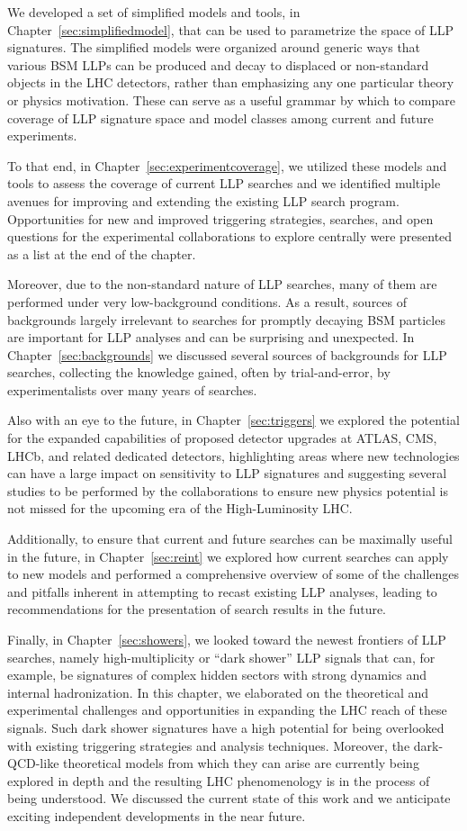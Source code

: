 We developed a set of simplified models and tools, in Chapter~\ref{sec:simplifiedmodel}, that can be used to parametrize the space of LLP signatures. The simplified models were organized around generic ways that various BSM LLPs can be produced and decay to displaced or non-standard objects in the LHC detectors, rather than emphasizing any one particular theory or physics motivation.
These can serve as a useful grammar by which to compare coverage of LLP signature space and model classes among current and future experiments.

To that end, in Chapter~\ref{sec:experimentcoverage}, we utilized these models and tools to assess the coverage of current LLP searches and we identified multiple avenues for improving and extending the existing LLP search program.
Opportunities for new and improved triggering strategies, searches, and open questions for the experimental collaborations to explore centrally were presented as a list at the end of the chapter.

Moreover, due to the non-standard nature of LLP searches, many of them are performed under very low-background conditions.
As a result, sources of backgrounds largely irrelevant to searches for promptly decaying BSM particles are important for LLP analyses and can be surprising and unexpected.
In Chapter~\ref{sec:backgrounds} we discussed several sources of backgrounds for LLP searches, collecting the knowledge gained, often by trial-and-error, by experimentalists over many years of searches.

Also with an eye to the future, in Chapter~\ref{sec:triggers} we explored the potential for the expanded capabilities of proposed detector upgrades at ATLAS, CMS, LHCb, and related dedicated detectors, highlighting areas where new technologies can have a large impact on sensitivity to LLP signatures and suggesting several studies to be performed by the collaborations to ensure new physics potential is not missed for the upcoming era of the High-Luminosity LHC.

Additionally, to ensure that current and future searches can be maximally useful in the future, in Chapter~\ref{sec:reint} we explored how current searches can apply to new models and performed a comprehensive overview of some of the challenges and pitfalls inherent in attempting to recast existing LLP analyses, leading to recommendations for the presentation of search results in the future.

Finally, in Chapter~\ref{sec:showers}, we looked toward the newest frontiers of LLP searches, namely high-multiplicity or ``dark shower'' LLP signals that can, for example, be signatures of complex hidden sectors with strong dynamics and internal hadronization.
In this chapter, we elaborated on the theoretical and experimental challenges and opportunities in expanding the LHC reach of these signals.
Such dark shower signatures have a high potential for being overlooked with existing triggering strategies and analysis techniques.
Moreover, the dark-QCD-like theoretical models from which they can arise are currently being explored in depth and the resulting LHC phenomenology is in the process of being understood.
We discussed the current state of this work and we anticipate exciting independent developments in the near future.

